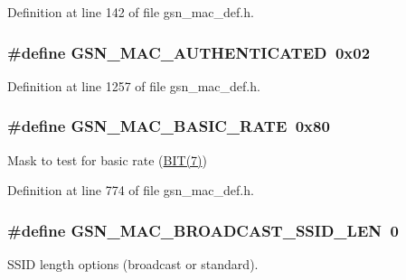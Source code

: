 Definition at line 142 of file gsn\_\-mac\_\-def.h.

\hypertarget{a00642_ga11cf8c8f47218aaccfe9b0342ad34b1a}{
\subsubsection[{GSN\_\-MAC\_\-AUTHENTICATED}]{\setlength{\rightskip}{0pt plus 5cm}\#define GSN\_\-MAC\_\-AUTHENTICATED~0x02}}
\label{a00642_ga11cf8c8f47218aaccfe9b0342ad34b1a}


Definition at line 1257 of file gsn\_\-mac\_\-def.h.

\hypertarget{a00642_ga5dd3f6052d990b4ee0d404f05787ce20}{
\subsubsection[{GSN\_\-MAC\_\-BASIC\_\-RATE}]{\setlength{\rightskip}{0pt plus 5cm}\#define GSN\_\-MAC\_\-BASIC\_\-RATE~0x80}}
\label{a00642_ga5dd3f6052d990b4ee0d404f05787ce20}


Mask to test for basic rate (\hyperlink{a00481_a3a8ea58898cb58fc96013383d39f482c}{BIT(7)}) 



Definition at line 774 of file gsn\_\-mac\_\-def.h.

\hypertarget{a00642_gaa9374ba371dac462bbc520ad04eb91a1}{
\subsubsection[{GSN\_\-MAC\_\-BROADCAST\_\-SSID\_\-LEN}]{\setlength{\rightskip}{0pt plus 5cm}\#define GSN\_\-MAC\_\-BROADCAST\_\-SSID\_\-LEN~0}}
\label{a00642_gaa9374ba371dac462bbc520ad04eb91a1}


SSID length options (broadcast or standard). 



